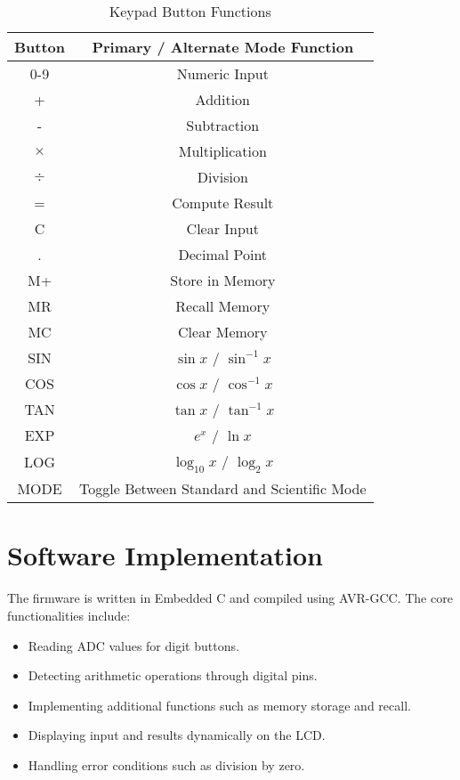 \documentclass[journal]{IEEEtran}
\begin{document}
\vspace{-3mm}

\begin{table}[h!]
\centering
\small
\begin{tabular}{|c|c|}
\hline
\textbf{Button} & \textbf{Primary / Alternate Mode Function} \\
\hline
0-9 & Numeric Input \\
\hline
+ & Addition \\
\hline
- & Subtraction \\
\hline
$\times$ & Multiplication \\
\hline
$\div$ & Division \\
\hline
= & Compute Result \\
\hline
C & Clear Input \\
\hline
. & Decimal Point \\
\hline
M+ & Store in Memory \\
\hline
MR & Recall Memory \\
\hline
MC & Clear Memory \\
\hline
SIN & $\sin x$ / $\sin^{-1} x$ \\
\hline
COS & $\cos x$ / $\cos^{-1} x$ \\
\hline
TAN & $\tan x$ / $\tan^{-1} x$ \\
\hline
EXP & $e^x$ / $\ln x$ \\
\hline
LOG & $\log_{10} x$ / $\log_2 x$ \\
\hline
MODE & Toggle Between Standard and Scientific Mode \\
\hline
\end{tabular}
\caption{Keypad Button Functions}
\label{tab:keypad}
\end{table}


\section{Software Implementation}
The firmware is written in Embedded C and compiled using AVR-GCC. The core functionalities include:
\begin{itemize}
\item Reading ADC values for digit buttons.
\item Detecting arithmetic operations through digital pins.
\item Implementing additional functions such as memory storage and recall.
\item Displaying input and results dynamically on the LCD.
\item Handling error conditions such as division by zero.
\end{itemize}
\end{document}
